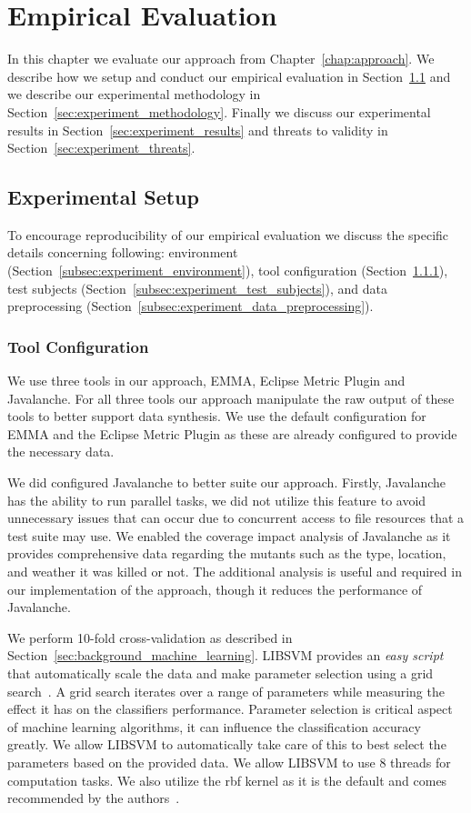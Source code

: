 \chapter{Empirical Evaluation}
\label{chap:experiment}
In this chapter we evaluate our approach from Chapter~\ref{chap:approach}. We describe how we setup and conduct our empirical evaluation in Section~\ref{sec:experiment_setup} and we describe our experimental methodology in Section~\ref{sec:experiment_methodology}. Finally we discuss our experimental results in Section~\ref{sec:experiment_results} and threats to validity in Section~\ref{sec:experiment_threats}.


\section{Experimental Setup}
\label{sec:experiment_setup}
To encourage reproducibility of our empirical evaluation we discuss the specific details concerning following: environment (Section~\ref{subsec:experiment_environment}), tool configuration (Section~\ref{subsec:experiment_tool_configuration}), test subjects (Section~\ref{subsec:experiment_test_subjects}), and data preprocessing (Section~\ref{subsec:experiment_data_preprocessing}).


\subsection{Tool Configuration}
\label{subsec:experiment_tool_configuration}
We use three tools in our approach, EMMA, Eclipse Metric Plugin and Javalanche. For all three tools our approach manipulate the raw output of these tools to better support data synthesis. We use the default configuration for EMMA and the Eclipse Metric Plugin as these are already configured to provide the necessary data.

We did configured Javalanche to better suite our approach. Firstly, Javalanche has the ability to run parallel tasks, we did not utilize this feature to avoid unnecessary issues that can occur due to concurrent access to file resources that a test suite may use. We enabled the coverage impact analysis of Javalanche as it provides comprehensive data regarding the mutants such as the type, location, and weather it was killed or not. The additional analysis is useful and required in our implementation of the approach, though it reduces the performance of Javalanche.

We perform 10-fold cross-validation as described in Section~\ref{sec:background_machine_learning}. LIBSVM provides an \emph{easy script} that automatically scale the data and make parameter selection using a grid search~\cite{HCL03}. A grid search iterates over a range of parameters while measuring the effect it has on the classifiers performance. Parameter selection is critical aspect of machine learning algorithms, it can influence the classification accuracy greatly. We allow LIBSVM to automatically take care of this to best select the parameters based on the provided data. We allow LIBSVM to use 8 threads for computation tasks. We also utilize the \gls{rbf} kernel as it is the default and comes recommended by the authors~\cite{HCL03}.

